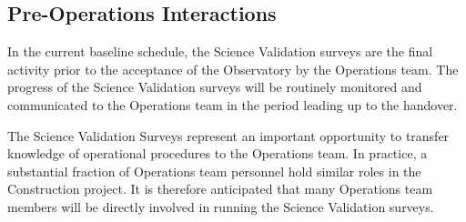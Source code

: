 \subsection{Pre-Operations Interactions}

In the current baseline schedule, the Science Validation surveys are the final activity prior to the acceptance of the Observatory by the Operations team.
The progress of the Science Validation surveys will be routinely monitored and communicated to the Operations team in the period leading up to the handover.

The Science Validation Surveys represent an important opportunity to transfer knowledge of operational procedures to the Operations team.
In practice, a substantial fraction of Operations team personnel hold similar roles in the Construction project.
It is therefore anticipated that many Operations team members will be directly involved in running the Science Validation surveys.




